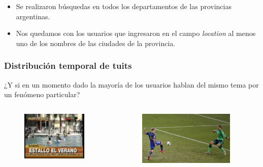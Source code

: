 \begin{frame}[c]
\begin{itemize}
    \item Se realizaron búsquedas en todos los departamentos de las provincias argentinas.
    \item Nos quedamos con los usuarios que ingresaron en el campo \textit{location} al menos uno de los nombres de las ciudades de la provincia. 

\end{itemize}



\end{frame}

\begin{frame}[c]\frametitle{Distribución temporal de tuits}
    ¿Y si en un momento dado la mayoría de los usuarios hablan del mismo tema por un fenómeno particular?
    \begin{columns}
    \begin{column}{.30\textwidth}
        \begin{figure}
        \includegraphics[width=0.9\textwidth]{../src/images/presentacion/estalloelverano.jpg}
        \label{fig:estalloelverano}
        \end{figure}
    \end{column}
    \begin{column}{.30\textwidth}   
        \begin{figure}
        \includegraphics[width=0.9\textwidth]{../src/images/presentacion/eraporabajo.jpg}
        \label{fig:eraporabajo}
        \end{figure} 
    \end{column}
    

\end{columns}
\end{frame}
